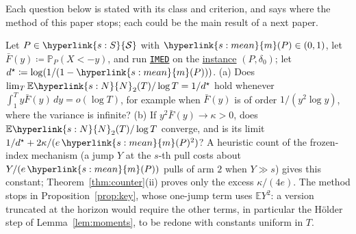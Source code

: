 \documentclass[11pt]{article}
\newcommand{\E}{\mathbb{E}}
\newcommand{\Prob}{\mathbb{P}}
\newcommand{\sy}[2]{{\hyperlink{#1}{#2}}}
\newcommand{\term}[2]{\hyperlink{#1}{#2}}
\newcommand{\imed}{\hyperref[alg:imed]{\texttt{IMED}}}
\newcommand{\Sm}{\sy{s:S}{\mathcal{S}}}
\newcommand{\mean}{\sy{s:mean}{m}}
\newcommand{\Np}{\sy{s:N}{N}}
\begin{document}
Each question below is stated with its class and criterion, and says where the method of this paper
stops; each could be the main result of a next paper.

\begin{openquestion}\label{oq:boundary}
Let $P\in\Sm$ with $\mean(P)\in(0,1)$, let $\bar F(y)\coloneqq\Prob_P(X<-y)$, and run \imed{} on the
\term{w:instance}{instance} $(P,\delta_0)$; let $d^\star\coloneqq\log(1/(1-\mean(P)))$. (a) Does $\lim_T\E \Np_2(T)/\log T=1/d^\star$
hold whenever $\int_1^Ty\bar F(y)\,dy=o(\log T)$, for example when $\bar F(y)$ is of order
$1/(y^2\log y)$, where the variance is infinite? (b) If $y^2\bar F(y)\to\kappa>0$, does
$\E \Np_2(T)/\log T$ converge, and is its limit $1/d^\star+2\kappa/(e\,\mean(P)^2)$? A heuristic count of the frozen-index
mechanism (a jump $Y$ at the $s$-th pull costs about $Y/(e\,\mean(P))$ pulls of arm $2$ when $Y\gg s$)
gives this constant; Theorem~\ref{thm:counter}(ii) proves only the excess $\kappa/(4e)$. The method
stops in Proposition~\ref{prop:key}, whose one-jump term uses $\E Y^2$: a version truncated at the
horizon would require the other terms, in particular the H\"older step of Lemma~\ref{lem:moments}, to
be redone with constants uniform in $T$.
\end{openquestion}
\end{document}
